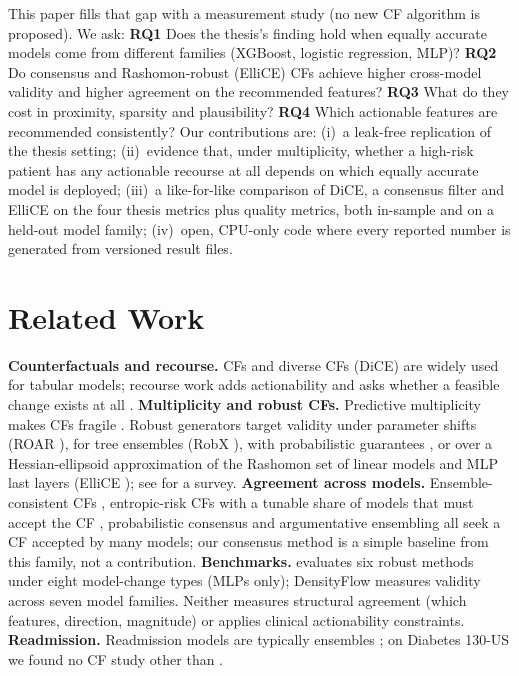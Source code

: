 \documentclass[conference]{IEEEtran}
\begin{document}
This paper fills that gap with a measurement study (no new CF algorithm is proposed). We ask:
\textbf{RQ1} Does the thesis's finding hold when equally accurate models come from different families (XGBoost,
logistic regression, MLP)? \textbf{RQ2} Do consensus and Rashomon-robust (ElliCE) CFs achieve higher cross-model
validity and higher agreement on the recommended features? \textbf{RQ3} What do they cost in proximity, sparsity and
plausibility? \textbf{RQ4} Which actionable features are recommended consistently?
Our contributions are: (i)~a leak-free replication of the thesis setting; (ii)~evidence that, under multiplicity,
whether a high-risk patient has any actionable recourse at all depends on which equally accurate model is deployed;
(iii)~a like-for-like comparison of DiCE, a consensus filter and ElliCE on the four thesis metrics plus quality
metrics, both in-sample and on a held-out model family; (iv)~open, CPU-only code where every reported number is
generated from versioned result files.

\section{Related Work}
\textbf{Counterfactuals and recourse.} CFs \cite{wachter2018} and diverse CFs (DiCE) \cite{mothilal2020dice} are
widely used for tabular models; recourse work adds actionability and asks whether a feasible change exists at all
\cite{ustun2019recourse}.
\textbf{Multiplicity and robust CFs.} Predictive multiplicity \cite{marx2020multiplicity} makes CFs fragile
\cite{pawelczyk2020multiplicity,black2022consistent}. Robust generators target validity under parameter shifts
(ROAR \cite{upadhyay2021roar}), for tree ensembles (RobX \cite{dutta2022robx}), with probabilistic guarantees
\cite{hamman2023}, or over a Hessian-ellipsoid approximation of the Rashomon set of linear models and MLP last layers
(ElliCE \cite{turbal2025ellice}); see \cite{jiang2024survey} for a survey.
\textbf{Agreement across models.} Ensemble-consistent CFs \cite{artelt2022ensemble}, entropic-risk CFs with a tunable
share of models that must accept the CF \cite{noorani2025entropic}, probabilistic consensus \cite{kostrzewa2026croce}
and argumentative ensembling \cite{jiang2024argumentative,jiang2025argumentative} all seek a CF accepted by many models;
our consensus method is a simple baseline from this family, not a contribution.
\textbf{Benchmarks.} \cite{kostrzewa2026which} evaluates six robust methods under eight model-change types (MLPs only);
DensityFlow \cite{tan2026densityflow} measures validity across seven model families. Neither measures structural
agreement (which features, direction, magnitude) or applies clinical actionability constraints.
\textbf{Readmission.} Readmission models are typically ensembles \cite{yu2020readmission}; on Diabetes 130-US we found
no CF study other than \cite{emekci2026}.
\end{document}

